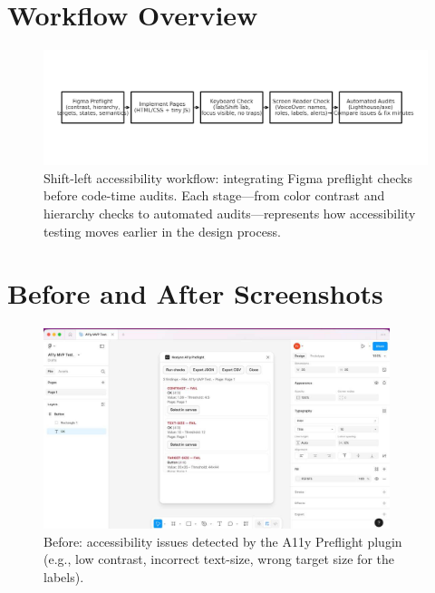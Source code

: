 \documentclass[12pt]{article}
\begin{document}
\section{Workflow Overview}
\begin{figure}[H]
  \centering
  \includegraphics[width=\textwidth, keepaspectratio]{logic-diagram.png}
  \caption{Shift-left accessibility workflow: integrating Figma preflight checks before code-time audits. Each stage—from color contrast and hierarchy checks to automated audits—represents how accessibility testing moves earlier in the design process.}
  \label{fig:workflow}
  \vspace{0.5em}
\end{figure}

\section{Before and After Screenshots}
\begin{figure}[H]
  \centering
  \includegraphics[width=0.9\textwidth]{before.jpg}
  \caption{Before: accessibility issues detected by the A11y Preflight plugin (e.g., low contrast, incorrect text-size, wrong target size for the labels).}
  \label{fig:before}
\end{figure}
\end{document}
